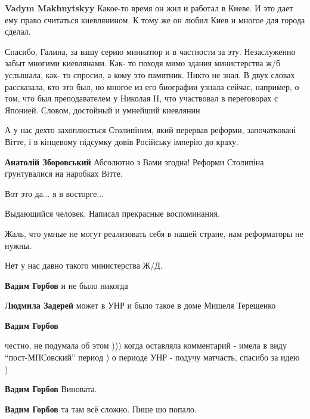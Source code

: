 \begin{itemize}
\begin{itemize} %
\textbf{Vadym Makhnytskyy} Какое-то время он жил и работал в Киеве. И это дает ему право считаться киевлянином. К тому же он любил Киев и многое для города сделал.
\end{itemize} %


Спасибо, Галина, за вашу серию миниатюр и в частности за эту. Незаслуженно
забыт многими киевлянами. Как- то походя мимо здания министерства ж/б услышала,
как- то спросил, а кому это памятник. Никто не знал. В двух словах рассказала,
кто это был, но многое из его биографии узнала сейчас, например, о том, что был
преподавателем у Николая II, что участвовал в переговорах с Японией. Словом,
достойный и умнейший киевлянин



А у нас дехто захоплюється Столипіним, який перервав реформи, започатковані
Вітте, і в кінцевому підсумку довів Російську імперію до краху.

\begin{itemize} %
\textbf{Анатолій Зборовський} Абсолютно з Вами згодна! Реформи Столипіна грунтувалися на наробках Вітте.
\end{itemize} %

Вот это да... я в восторге...

Выдающийся человек. Написал прекрасные воспоминания.

Жаль, что умные не могут реализовать себя в нашей стране, нам реформаторы не нужны.

Нет у нас давно такого министерства Ж/Д.

\begin{itemize} %
\textbf{Вадим Горбов} и не было никогда

\textbf{Людмила Задерей} может в УНР и было такое в доме Мишеля Терещенко

\textbf{Вадим Горбов} 

честно, не подумала об этом ))) когда оставляла комментарий - имела в виду
\enquote{пост-МПСовский} период ) о периоде УНР - подучу матчасть, спасибо за идею )


\textbf{Вадим Горбов} Виновата.

\textbf{Вадим Горбов} та там всё сложно. Пише шо попало.


\end{itemize}
\end{itemize}
